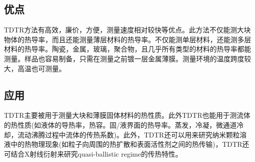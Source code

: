 \documentclass[UTF8]{ctexart}
\begin{document}
	\subsection{优点}
	TDTR方法有高效，廉价，方便，测量速度相对较快等优点。此方法不仅能测大块物体的热导率，而且还能测量薄层材料的热导率。不仅能测单层材料，还能测多层材料的热导率。陶瓷，金属，玻璃，聚合物，且几乎所有类型的材料的热导率都能测量。样品也容易制备，只需在测量之前镀一层金属薄膜。测量环境的温度跨度较大，高温也可测量。
	\subsection{应用}
	TDTR主要被用于测量大块和薄膜固体材料的热性质。此外TDTR也能用于测流体的热性质(如液体的导热率，热容。固/液界面的热导率。蒸发，冷凝，微通道冷却，流动沸腾过程中流体的传热系数)。此外，TDTR还可以用来研究纳米颗粒溶液中的热物理现象(如粒子向周围的热扩散和表面活性剂之间的热传输)，TDTR还可结合X射线衍射来研究quasi-ballistic regime的传热特性。
\end{document}
